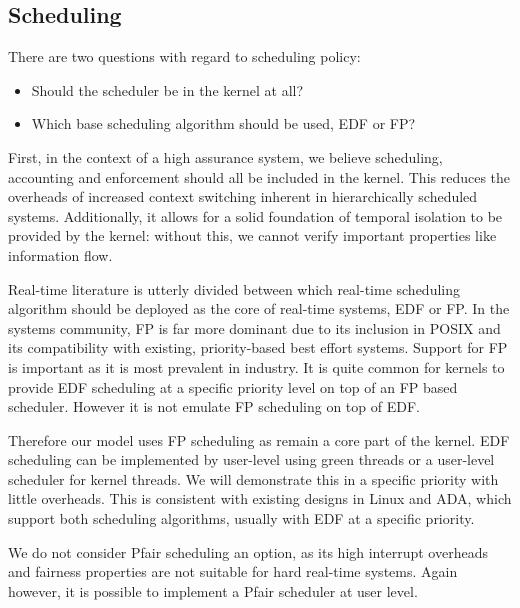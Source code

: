 \subsection{Scheduling}

There are two questions with regard to scheduling policy:

\begin{itemize}
\item Should the scheduler be in the kernel at all?
\item Which base scheduling algorithm should be used, \gls{EDF} or {FP}?
\end{itemize}

First, in the context of a high assurance system, we believe scheduling, accounting and enforcement should all be included in the kernel.
This reduces the overheads of increased context switching inherent in hierarchically scheduled systems.
Additionally, it allows for a solid foundation of temporal isolation to be provided by the kernel: without this, we cannot verify important properties like information flow.

Real-time literature is utterly divided between which real-time scheduling algorithm should be deployed as the core of real-time systems, \gls{EDF} or \gls{FP}.
In the systems community, \gls{FP} is far more dominant due to its inclusion in \gls{POSIX} and its compatibility with existing, priority-based best effort systems.
Support for \gls{FP} is important as it is most prevalent in industry.
It is quite common for kernels to provide \gls{EDF} scheduling at a specific priority level on top of an \gls{FP} based scheduler.
However it is not emulate \gls{FP} scheduling on top of \gls{EDF}.

Therefore our model uses \gls{FP} scheduling as remain a core part of the kernel.
\gls{EDF} scheduling can be implemented by user-level using green threads or a user-level scheduler for kernel threads.
We will demonstrate this in %
a specific priority with little overheads.
This is consistent with existing designs in Linux  and ADA\citep{Burns_Wellings:crtpa}, which support both scheduling algorithms, usually with \gls{EDF} at a specific priority.

We do not consider Pfair scheduling an option, as its high interrupt overheads and fairness properties are not suitable for hard real-time systems.
Again however, it is possible to implement a Pfair scheduler at user level.

